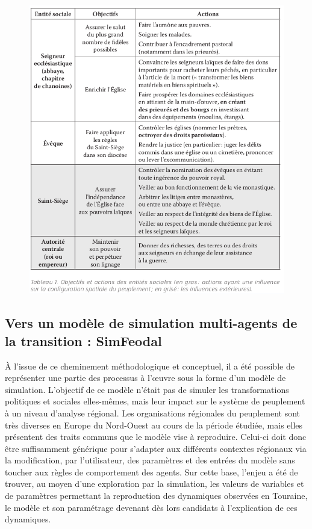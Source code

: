 \documentclass[12pt, a4paper, oneside]{book}
\begin{document}
	\begin{figure}[H]
	\centering
	\includegraphics[width=1\linewidth]{src/Chapitre_TMD/Tab1_2.png}
	\end{figure}
	
	\subsection{Vers un modèle de simulation multi-agents de la transition : SimFeodal}
	
	À l'issue de ce cheminement méthodologique et conceptuel, il a été possible de représenter une partie des processus à l'œuvre sous la forme d'un modèle de simulation.
	L'objectif de ce modèle n'était pas de simuler les transformations politiques et sociales elles-mêmes, mais leur impact sur le système	de peuplement à un niveau d'analyse régional.
	Les organisations régionales du peuplement sont très diverses en Europe du Nord-Ouest au cours de la période étudiée, mais elles présentent des traits communs que le modèle vise à reproduire.
	Celui-ci doit donc être suffisamment générique pour s'adapter aux différents contextes régionaux via la modification, par l'utilisateur, des paramètres et des entrées du modèle sans toucher aux règles de comportement des agents.
	Sur cette base, l'enjeu a été de trouver, au moyen d'une exploration par la simulation, les valeurs de variables et de paramètres permettant la reproduction des dynamiques observées en Touraine, le modèle et son paramétrage	devenant dès lors candidats à l'explication de ces dynamiques.
	
\end{document}
